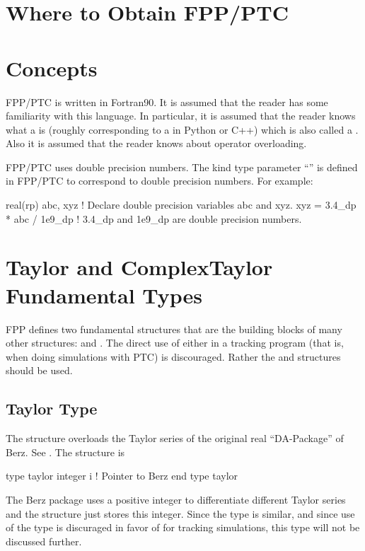 \documentclass{hitec}     %
\newcommand{\Section}[1]{\section{#1}\vspace*{-1ex}}
\begin{document}
\Section{Where to Obtain FPP/PTC}
\label{s:obtain}

\Section{Concepts}
\label{s:concepts}

FPP/PTC is written in Fortran90. It is assumed that the reader has some familiarity with this language. In particular, it is assumed that the reader knows what a  is (roughly corresponding to a  in Python or C++) which is also called a . Also it is assumed that the reader knows about operator overloading.

FPP/PTC uses double precision numbers. The kind type parameter ``'' is defined in FPP/PTC to correspond to double precision numbers. For example:
\begin{code}
  real(rp) abc, xyz             ! Declare double precision variables abc and xyz.
  xyz = 3.4_dp * abc / 1e9_dp   ! 3.4_dp and 1e9_dp are double precision numbers.
\end{code}

\Section{Taylor and ComplexTaylor Fundamental Types}
\label{s:fundamental}

FPP defines two fundamental structures that are the building blocks of many other structures:  and
. The direct use of either in a tracking program (that is, when doing simulations with PTC) is
discouraged. Rather the  and  structures should be used.

\subsection{Taylor Type}
\label{s:taylor}

The  structure overloads the Taylor series of the original real ``DA-Package'' of
Berz. See . The structure is
\begin{code}
type taylor
   integer i    ! Pointer to Berz
end type taylor
\end{code}
The Berz package uses a positive integer to differentiate different Taylor series and the
 structure just stores this integer. Since the  type is similar, and since use
of the  type is discuraged in favor of  for tracking simulations, this type will not
be discussed further.
\end{document}
